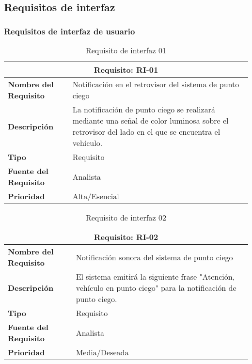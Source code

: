 

\subsection{Requisitos de interfaz}
\subsubsection{Requisitos de interfaz de usuario}

\begin{table}[H]
\begin{center}
\begin{tabular}{p{} p{7cm}}
\multicolumn{2}{c}{\textbf{Requisito: RI-01} } \\
\hline \hline
\textbf{Nombre del Requisito} & Notificación en el retrovisor del sistema de punto ciego \\
\hline
\textbf{Descripción} & La notificación de punto ciego se realizará mediante una señal de color luminosa sobre el retrovisor del lado en el que se encuentra el vehículo. \\
\hline
\textbf{Tipo} & Requisito  \\
\hline
\textbf{Fuente del Requisito} & Analista \\
\hline
\textbf{Prioridad} & Alta/Esencial  \\ \hline
\end{tabular}
\caption{Requisito de interfaz 01}
\label{tab:RI-01}
\end{center}
\end{table}

\begin{table}[H]
\begin{center}
\begin{tabular}{p{} p{7cm}}
\multicolumn{2}{c}{\textbf{Requisito: RI-02} } \\
\hline \hline
\textbf{Nombre del Requisito} & Notificación sonora del sistema de punto ciego\\
\hline
\textbf{Descripción} & El sistema emitirá la siguiente frase "Atención, vehículo en punto ciego" para la notificación de punto ciego. \\
\hline
\textbf{Tipo} & Requisito  \\
\hline
\textbf{Fuente del Requisito} & Analista \\
\hline
\textbf{Prioridad} & Media/Deseada  \\ \hline
\end{tabular}
\caption{Requisito de interfaz 02}
\label{tab:RI-02}
\end{center}
\end{table}

